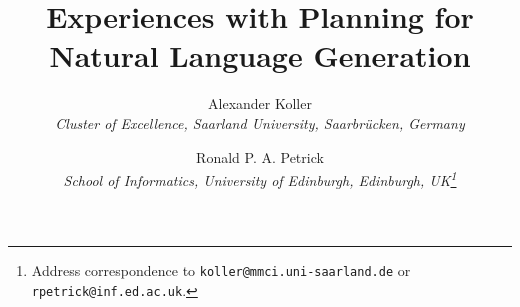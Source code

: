\documentclass[useAMS,usenatbib]{coin}
\title{Experiences with Planning for Natural Language Generation}
\author{{\sc Alexander Koller}\\
        {\it Cluster of Excellence, Saarland University, Saarbr\"ucken, Germany}\\ 
		\and
        {\sc Ronald P. A. Petrick}\\
        {\it School of Informatics, University of Edinburgh,
          Edinburgh, UK\thanks{Address correspondence to
          \texttt{koller@mmci.uni-saarland.de} or
          \texttt{rpetrick@inf.ed.ac.uk}.}}
}
\date{}
\begin{document}


\maketitle












\pagebreak
\listoffigures
\end{document}
